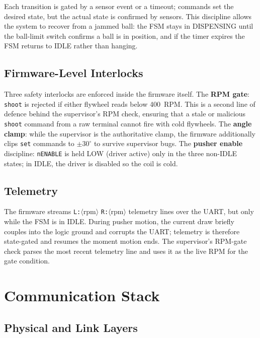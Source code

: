 Each transition is gated by a sensor event or a timeout; commands set the desired state, but the actual state is confirmed by sensors. This discipline allows the system to recover from a jammed ball: the FSM stays in DISPENSING until the ball-limit switch confirms a ball is in position, and if the timer expires the FSM returns to IDLE rather than hanging.

\subsection{Firmware-Level Interlocks}

Three safety interlocks are enforced inside the firmware itself. The \textbf{RPM gate}: \texttt{shoot} is rejected if either flywheel reads below 400~RPM. This is a second line of defence behind the supervisor's RPM check, ensuring that a stale or malicious \texttt{shoot} command from a raw terminal cannot fire with cold flywheels. The \textbf{angle clamp}: while the supervisor is the authoritative clamp, the firmware additionally clips \texttt{set} commands to $\pm 30^\circ$ to survive supervisor bugs. The \textbf{pusher enable} discipline: \texttt{nENABLE} is held LOW (driver active) only in the three non-IDLE states; in IDLE, the driver is disabled so the coil is cold.

\subsection{Telemetry}

The firmware streams \texttt{L:}$\langle$rpm$\rangle$ \texttt{R:}$\langle$rpm$\rangle$ telemetry lines over the UART, but only while the FSM is in IDLE. During pusher motion, the current draw briefly couples into the logic ground and corrupts the UART; telemetry is therefore state-gated and resumes the moment motion ends. The supervisor's RPM-gate check parses the most recent telemetry line and uses it as the live RPM for the gate condition.

\section{Communication Stack}

\subsection{Physical and Link Layers}

